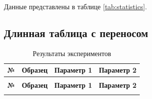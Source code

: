 Данные представлены в таблице \ref{tab:statistics}.

\subsection{Длинная таблица с переносом}

\begin{longtable}{|c|l|c|c|}
\caption{Результаты экспериментов} \label{tab:long_experiments} \\

\hline
\textbf{№} & \textbf{Образец} & \textbf{Параметр 1} & \textbf{Параметр 2} \\
\hline
\endfirsthead

\tablecontinuation{\thetable} \\
\hline
\textbf{№} & \textbf{Образец} & \textbf{Параметр 1} & \textbf{Параметр 2} \\
\hline
\endhead

\hline
\endfoot

\hline
\endlastfoot


\end{longtable}
